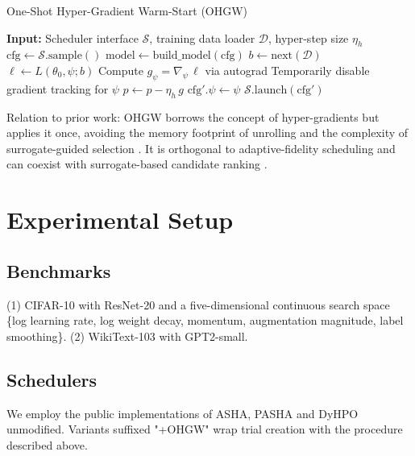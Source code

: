 \documentclass{article}
\begin{document}
\begin{algorithm}
\caption{One-Shot Hyper-Gradient Warm-Start (OHGW)}
\begin{algorithmic}[1]
\State \textbf{Input:} Scheduler interface \(\mathcal{S}\), training data loader \(\mathcal{D}\), hyper-step size \(\eta_h\)
  \State \(\text{cfg} \leftarrow \mathcal{S}.\text{sample}()\) 
  \State \(\text{model} \leftarrow \text{build\_model}(\text{cfg})\)
  \State \(b \leftarrow \text{next}(\mathcal{D})\) 
  \State \(\ell \leftarrow L(\theta_0, \psi; b)\) 
  \State Compute \(g_{\psi} = \nabla_{\psi} \, \ell\) via autograd 
  \State Temporarily disable gradient tracking for \(\psi\)
    \State \(p \leftarrow p - \eta_h \, g\)
  \EndFor
  \State \(\text{cfg}'.\psi \leftarrow \psi\) 
  \State \(\mathcal{S}.\text{launch}(\text{cfg}')\) 
\EndWhile
\end{algorithmic}
\end{algorithm}

Relation to prior work: OHGW borrows the concept of hyper-gradients but applies it once, avoiding the memory footprint of unrolling \cite{bertrand-2020-implicit} and the complexity of surrogate-guided selection \cite{nguyen-2019-bayesian}. It is orthogonal to adaptive-fidelity scheduling \cite{jiang-2024-efficient} and can coexist with surrogate-based candidate ranking \cite{khazi-2023-deep}.

\section{Experimental Setup}
\subsection{Benchmarks}
(1) CIFAR-10 with ResNet-20 and a five-dimensional continuous search space \{log learning rate, log weight decay, momentum, augmentation magnitude, label smoothing\}. (2) WikiText-103 with GPT2-small.

\subsection{Schedulers}
We employ the public implementations of ASHA, PASHA and DyHPO \cite{bohdal-2022-pasha,wistuba-2022-supervising} unmodified. Variants suffixed "+OHGW" wrap trial creation with the procedure described above.
\end{document}
